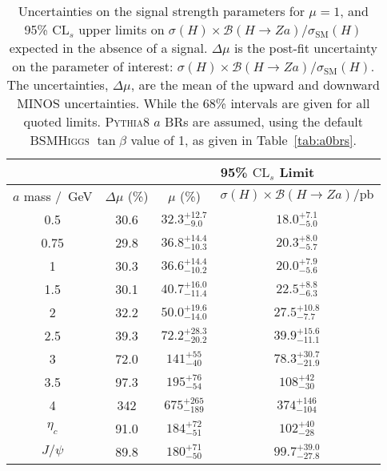 \documentclass[NOTE, atlasdraft=true, texlive=2017, UKenglish]{\ATLASLATEXPATH atlasdoc}
\begin{document}
\begin{table}[!htbp]{\footnotesize\renewcommand{\arraystretch}{1.2} %
  \begin{center}
    \footnotesize
    \begin{tabular}{|c|c|cc|}
      \cline{3-4}
      \multicolumn{2}{c}{} & \multicolumn{2}{|c|}{95\% $\text{CL}_s$ Limit}\\
      \hline
      $a$ mass /~GeV & $\Delta\mu$ (\%) & $\mu$ (\%) & $\sigma(H)\times \mathcal{B}(H\to Za)/\text{pb}$ \\
      \hline
      0.5 & 30.6 & $32.3 ^{+12.7}_{-9.0} $ & $18.0^{+7.1}_{-5.0}$ \\
      0.75 & 29.8 & $36.8 ^{+14.4}_{-10.3} $ & $20.3^{+8.0}_{-5.7}$ \\
      1 & 30.3 & $36.6 ^{+14.4}_{-10.2} $ & $20.0^{+7.9}_{-5.6}$ \\
      1.5 & 30.1 & $40.7 ^{+16.0}_{-11.4} $ & $22.5^{+8.8}_{-6.3}$ \\
      2 & 32.2 & $50.0 ^{+19.6}_{-14.0} $ & $27.5^{+10.8}_{-7.7}$ \\
      2.5 & 39.3 & $72.2 ^{+28.3}_{-20.2} $ & $39.9^{+15.6}_{-11.1}$ \\
      3 & 72.0 & $141 ^{+55}_{-40} $ & $78.3^{+30.7}_{-21.9}$ \\
      3.5 & 97.3 & $195 ^{+76}_{-54} $ & $108^{+42}_{-30}$ \\
      4 & 342 & $675 ^{+265}_{-189} $ & $374^{+146}_{-104}$ \\
      \hline
      $\eta_c$ & 91.0 & $184 ^{+72}_{-51} $ & $102^{+40}_{-28}$ \\
      $J/\psi$ & 89.8 & $180 ^{+71}_{-50} $ & $99.7^{+39.0}_{-27.8}$ \\
      \hline
    \end{tabular}
    \caption{Uncertainties on the signal strength parameters for $\mu=1$, and 95\% $\text{CL}_s$ upper limits on $\sigma(H) \times\mathcal{B}(H\to Za) / \sigma_\text{SM}(H)$ expected in the absence of a signal. $\Delta\mu$ is the post-fit uncertainty on the parameter of interest: $\sigma(H) \times\mathcal{B}(H\to Za) / \sigma_\text{SM}(H)$. The uncertainties, $\Delta\mu$, are the mean of the upward and downward \textsc{MINOS} uncertainties. While the 68\% intervals are given for all quoted limits. \textsc{Pythia}8 $a$ BRs are assumed, using the default \textsc{BSMHiggs} $\tan\beta$ value of 1, as given in Table~\ref{tab:a0brs}.}
    \label{tab:asimovresults}
  \end{center}}
\end{table}
\end{document}
